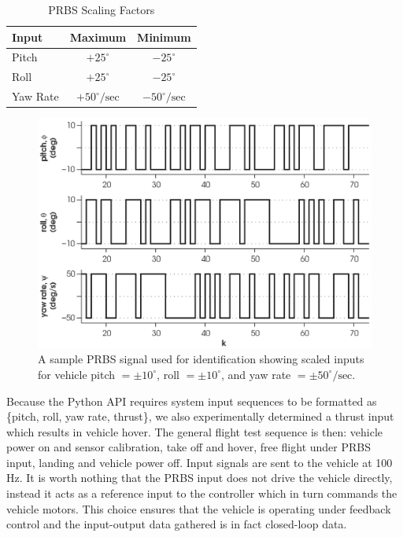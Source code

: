 \begin{table}[!htb]
\centering
\caption{PRBS Scaling Factors}\vspace{1em}
\begin{tabular}{lcc}
\toprule
Input & Maximum & Minimum\\
\midrule
Pitch & $+25^\circ$ & $-25^\circ$\\
Roll & $+25^\circ$ & $-25^\circ$\\
Yaw Rate & $+50^\circ/\mbox{sec}$ & $-50^\circ/\mbox{sec}$\\
\bottomrule
\end{tabular}
\end{table}

\begin{figure}[htb!]
	\centering
	\includegraphics{../fig/test_prbs.eps}
	\caption[A sample PRBS signal used for identification showing scaled inputs for vehicle pitch, roll, and yaw rate.]{A sample PRBS signal used for identification showing scaled inputs for vehicle pitch $= \pm 10^\circ$, roll $= \pm 10^\circ$, and yaw rate $= \pm 50^\circ/\mbox{sec}$.}
\end{figure}

Because the Python API requires system input sequences to be formatted as \{pitch, roll, yaw rate, thrust\}, we also experimentally determined a thrust input which results in vehicle hover. The general flight test sequence is then: vehicle power on and sensor calibration, take off and hover, free flight under PRBS input, landing and vehicle power off. Input signals are sent to the vehicle at 100 Hz. It is worth nothing that the PRBS input does not drive the vehicle directly, instead it acts as a reference input to the controller which in turn commands the vehicle motors. This choice ensures that the vehicle is operating under feedback control and the input-output data gathered is in fact closed-loop data.

